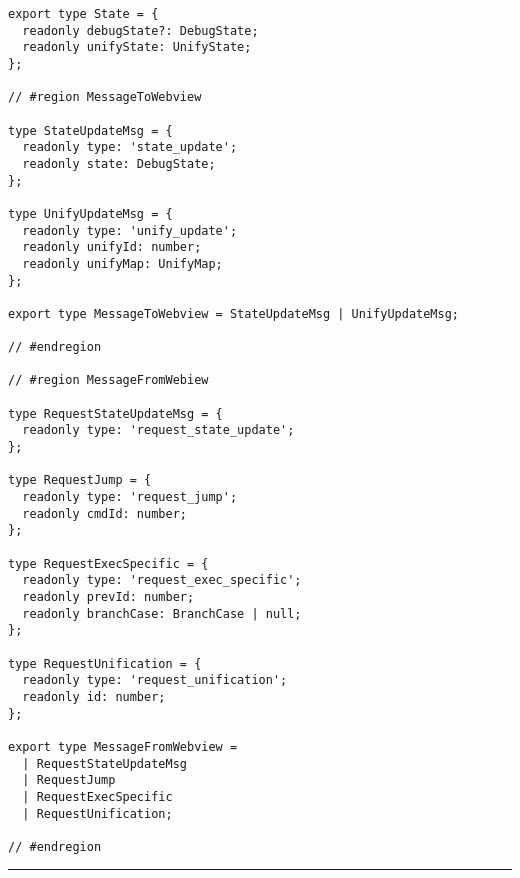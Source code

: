 \begin{verbatim}
export type State = {
  readonly debugState?: DebugState;
  readonly unifyState: UnifyState;
};

// #region MessageToWebview

type StateUpdateMsg = {
  readonly type: 'state_update';
  readonly state: DebugState;
};

type UnifyUpdateMsg = {
  readonly type: 'unify_update';
  readonly unifyId: number;
  readonly unifyMap: UnifyMap;
};

export type MessageToWebview = StateUpdateMsg | UnifyUpdateMsg;

// #endregion

// #region MessageFromWebiew

type RequestStateUpdateMsg = {
  readonly type: 'request_state_update';
};

type RequestJump = {
  readonly type: 'request_jump';
  readonly cmdId: number;
};

type RequestExecSpecific = {
  readonly type: 'request_exec_specific';
  readonly prevId: number;
  readonly branchCase: BranchCase | null;
};

type RequestUnification = {
  readonly type: 'request_unification';
  readonly id: number;
};

export type MessageFromWebview =
  | RequestStateUpdateMsg
  | RequestJump
  | RequestExecSpecific
  | RequestUnification;

// #endregion
\end{verbatim}
\vspace{-0.4cm}
\noindent\rule{\textwidth}{0.5pt}
\vspace{-0.6cm}
%
\label{lst:types-ts}